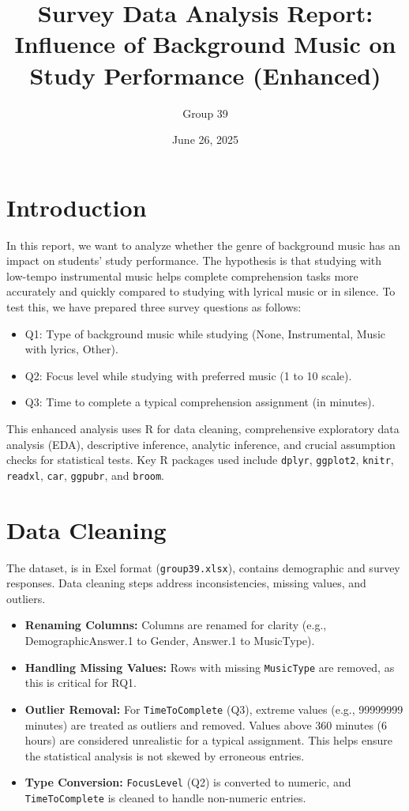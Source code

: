 \documentclass[
]{article}
\title{Survey Data Analysis Report: Influence of Background Music on
Study Performance (Enhanced)}
\author{Group 39}
\date{June 26, 2025}
\providecommand{\tightlist}{%
  \setlength{\itemsep}{0pt}\setlength{\parskip}{0pt}}
\begin{document}
\maketitle

{
\setcounter{tocdepth}{2}
\tableofcontents
}
\section{Introduction}\label{introduction}

In this report, we want to analyze whether the genre of background music
has an impact on students' study performance. The hypothesis is that
studying with low-tempo instrumental music helps complete comprehension
tasks more accurately and quickly compared to studying with lyrical
music or in silence. To test this, we have prepared three survey
questions as follows:

\begin{itemize}
\tightlist
\item
  Q1: Type of background music while studying (None, Instrumental, Music
  with lyrics, Other).
\item
  Q2: Focus level while studying with preferred music (1 to 10 scale).
\item
  Q3: Time to complete a typical comprehension assignment (in minutes).
\end{itemize}

This enhanced analysis uses R for data cleaning, comprehensive
exploratory data analysis (EDA), descriptive inference, analytic
inference, and crucial assumption checks for statistical tests. Key R
packages used include \texttt{dplyr}, \texttt{ggplot2}, \texttt{knitr},
\texttt{readxl}, \texttt{car}, \texttt{ggpubr}, and \texttt{broom}.

\section{Data Cleaning}\label{data-cleaning}

The dataset, is in Exel format (\texttt{group39.xlsx}), contains
demographic and survey responses. Data cleaning steps address
inconsistencies, missing values, and outliers.

\begin{itemize}
\tightlist
\item
  \textbf{Renaming Columns:} Columns are renamed for clarity (e.g.,
  DemographicAnswer.1 to Gender, Answer.1 to MusicType).
\item
  \textbf{Handling Missing Values:} Rows with missing \texttt{MusicType}
  are removed, as this is critical for RQ1.
\item
  \textbf{Outlier Removal:} For \texttt{TimeToComplete} (Q3), extreme
  values (e.g., 99999999 minutes) are treated as outliers and removed.
  Values above 360 minutes (6 hours) are considered unrealistic for a
  typical assignment. This helps ensure the statistical analysis is not
  skewed by erroneous entries.
\item
  \textbf{Type Conversion:} \texttt{FocusLevel} (Q2) is converted to
  numeric, and \texttt{TimeToComplete} is cleaned to handle non-numeric
  entries.
\end{itemize}
\end{document}
